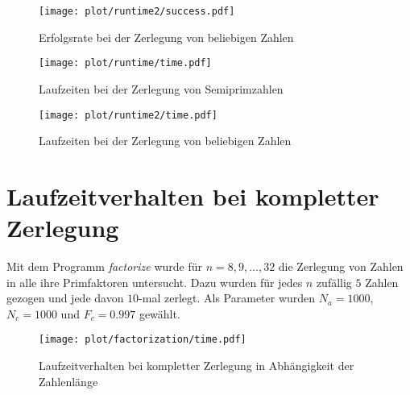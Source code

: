 \begin{figure}[ht]
		\centering
		\texttt{[image: plot/runtime2/success.pdf]}
		\caption{Erfolgsrate bei der Zerlegung von beliebigen Zahlen}\label{fig:runtime2-success}
\end{figure}
\begin{figure}[ht]
		\centering
		\texttt{[image: plot/runtime/time.pdf]}
		\caption{Laufzeiten bei der Zerlegung von Semiprimzahlen}\label{fig:runtime-runtime}
\end{figure}
\begin{figure}[ht]
		\centering
		\texttt{[image: plot/runtime2/time.pdf]}
		\caption{Laufzeiten bei der Zerlegung von beliebigen Zahlen}\label{fig:runtime2-runtime}
\end{figure}

\section{Laufzeitverhalten bei kompletter Zerlegung}
Mit dem Programm \textit{factorize} wurde für $n=8,9,\dots,32$ die Zerlegung von Zahlen in alle ihre Primfaktoren untersucht. Dazu wurden für jedes $n$ zufällig $5$ Zahlen gezogen und jede davon $10$-mal zerlegt. Als Parameter wurden $N_a=1000$, $N_c=1000$ und $F_c=0.997$ gewählt.
\begin{figure}[ht]
		\centering
		\texttt{[image: plot/factorization/time.pdf]}
		\caption{Laufzeitverhalten bei kompletter Zerlegung in Abhängigkeit der Zahlenlänge}
\end{figure}
